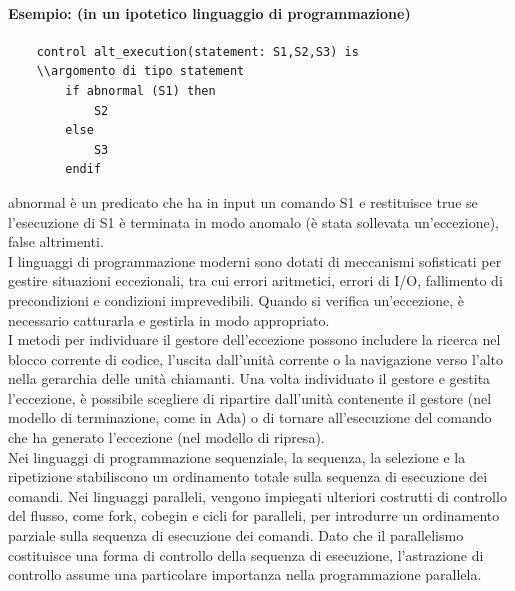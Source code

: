 \documentclass{article}
\begin{document}
	\paragraph*{Esempio: (in un ipotetico linguaggio di programmazione)}
	\begin{verbatim}
	control alt_execution(statement: S1,S2,S3) is
	\\argomento di tipo statement
		if abnormal (S1) then
			S2
		else
			S3
		endif
	\end{verbatim}
	abnormal è un predicato che ha in input un comando S1 e restituisce true se l'esecuzione di S1 è terminata in modo anomalo (è stata sollevata un'eccezione), false altrimenti.
	\vspace{\baselineskip} \\
	I linguaggi di programmazione moderni sono dotati di meccanismi sofisticati per gestire situazioni eccezionali, tra cui errori aritmetici, errori di I/O, fallimento di precondizioni e condizioni imprevedibili. Quando si verifica un'eccezione, è necessario catturarla e gestirla in modo appropriato.
	\vspace{\baselineskip} \\
	I metodi per individuare il gestore dell'eccezione possono includere la ricerca nel blocco corrente di codice, l'uscita dall'unità corrente o la navigazione verso l'alto nella gerarchia delle unità chiamanti. Una volta individuato il gestore e gestita l'eccezione, è possibile scegliere di ripartire dall'unità contenente il gestore (nel modello di terminazione, come in Ada) o di tornare all'esecuzione del comando che ha generato l'eccezione (nel modello di ripresa).
	\vspace{\baselineskip} \\
	Nei linguaggi di programmazione sequenziale, la sequenza, la selezione e la ripetizione stabiliscono un ordinamento totale sulla sequenza di esecuzione dei comandi. Nei linguaggi paralleli, vengono impiegati ulteriori costrutti di controllo del flusso, come fork, cobegin e cicli for paralleli, per introdurre un ordinamento parziale sulla sequenza di esecuzione dei comandi. Dato che il parallelismo costituisce una forma di controllo della sequenza di esecuzione, l'astrazione di controllo assume una particolare importanza nella programmazione parallela.
\end{document}
